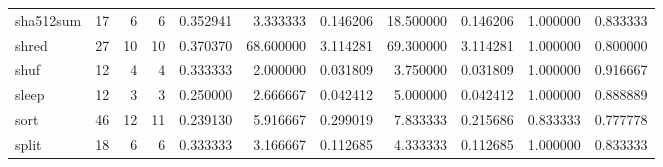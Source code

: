 \begin{longtable}{lrrrrrrrrrr}
sha512sum &                                      17 &                  6 &                                 6 &                                   0.352941 &                               3.333333 &                                     0.146206 &                         18.500000 &                                0.146206 &                           1.000000 &                                           0.833333 \\
shred     &                                      27 &                 10 &                                10 &                                   0.370370 &                              68.600000 &                                     3.114281 &                         69.300000 &                                3.114281 &                           1.000000 &                                           0.800000 \\
shuf      &                                      12 &                  4 &                                 4 &                                   0.333333 &                               2.000000 &                                     0.031809 &                          3.750000 &                                0.031809 &                           1.000000 &                                           0.916667 \\
sleep     &                                      12 &                  3 &                                 3 &                                   0.250000 &                               2.666667 &                                     0.042412 &                          5.000000 &                                0.042412 &                           1.000000 &                                           0.888889 \\
sort      &                                      46 &                 12 &                                11 &                                   0.239130 &                               5.916667 &                                     0.299019 &                          7.833333 &                                0.215686 &                           0.833333 &                                           0.777778 \\
split     &                                      18 &                  6 &                                 6 &                                   0.333333 &                               3.166667 &                                     0.112685 &                          4.333333 &                                0.112685 &                           1.000000 &                                           0.833333 \\

\end{longtable}
